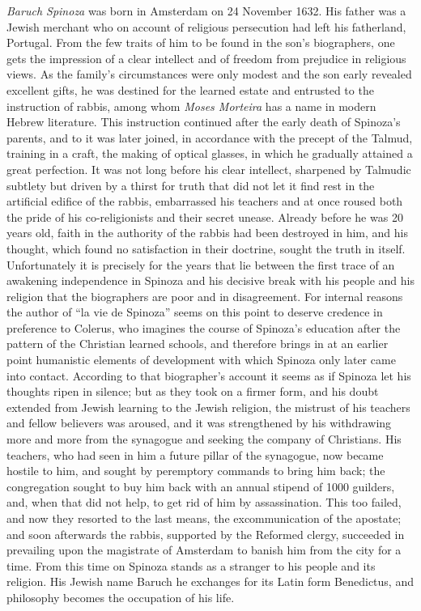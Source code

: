 \documentclass[12pt,a4paper,openany]{book}
\newcommand{\opage}[1]{\marginnote{\footnotesize\textit{[#1]}}}
\begin{document}
\emph{Baruch Spinoza} was born in Amsterdam on 24 November 1632. His
father was a Jewish merchant who on account of religious persecution had
left his fatherland, Portugal. From the few traits of him to be found in
the
\opage{29}son's biographers, one gets the impression of a clear intellect
and of freedom from prejudice in religious views. As the family's
circumstances were only modest and the son early revealed excellent
gifts, he was destined for the learned estate and entrusted to the
instruction of rabbis, among whom \emph{Moses Morteira} has a name in
modern Hebrew literature. This instruction continued after the early
death of Spinoza's parents, and to it was later joined, in accordance
with the precept of the Talmud, training in a craft, the making of
optical glasses, in which he gradually attained a great perfection. It
was not long before his clear intellect, sharpened by Talmudic subtlety
but driven by a thirst for truth that did not let it find rest in the
artificial edifice of the rabbis, embarrassed his teachers and at once
roused both the pride of his co-religionists and their secret unease.
Already before he was 20 years old, faith in the authority of the rabbis
had been destroyed in him, and his thought, which found no satisfaction
in their doctrine, sought the truth in itself. Unfortunately it is
precisely for the years that lie between the first trace of an awakening
independence in Spinoza and his decisive break with his people and his
religion that the biographers are poor and in disagreement. For internal
reasons the author of ``la vie de Spinoza'' seems on this point to
deserve credence in preference to Colerus, who imagines the course of
Spinoza's education after the pattern of the Christian learned schools,
and therefore brings in at an earlier point humanistic elements of
development with which Spinoza only later came into contact. According
to that biographer's account it seems as if Spinoza let his thoughts
ripen in silence; but as they took on a firmer form, and his doubt
extended from Jewish learning to the Jewish religion, the mistrust of his
teachers and fellow believers was aroused, and it was strengthened by
his withdrawing more and more from the synagogue and seeking the company
of Christians. His teachers, who had seen in him a future pillar of the
synagogue, now became hostile to him, and sought by peremptory commands
to bring him
\opage{30}back; the congregation sought to buy him back with an annual
stipend of 1000 guilders, and, when that did not help, to get rid of him
by assassination. This too failed, and now they resorted to the last
means, the excommunication of the apostate; and soon afterwards the
rabbis, supported by the Reformed clergy, succeeded in prevailing upon
the magistrate of Amsterdam to banish him from the city for a time. From
this time on Spinoza stands as a stranger to his people and its
religion. His Jewish name Baruch he exchanges for its Latin form
Benedictus, and philosophy becomes the occupation of his life.
\end{document}
